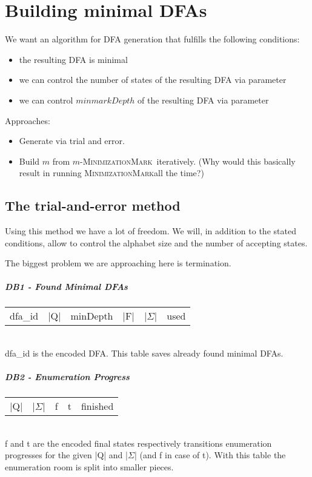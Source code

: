 \documentclass[a4paper, oneside, 11pt]{report}
\theoremstyle{definition}
\theoremstyle{remark}
\newcommand{\MinMark}{\textsc{MinimizationMark}}
\begin{document}
\chapter{Building minimal DFAs}

We want an algorithm for DFA generation that fulfills the following conditions:
\begin{itemize}
	\item the resulting DFA is minimal
	\item we can control the number of states of the resulting DFA via parameter
	\item we can control $minmarkDepth$ of the resulting DFA via parameter
\end{itemize}
Approaches:
\begin{itemize}
	\item Generate via trial and error.
	\item Build $m$ from $m$-\MinMark\ iteratively. (Why would this basically result in running \MinMark all the time?)
\end{itemize}

\section{The trial-and-error method}

Using this method we have a lot of freedom. We will, in addition to the stated conditions, allow to control the alphabet size and the number of accepting states.

The biggest problem we are approaching here is termination.

\paragraph*{DB1 - Found Minimal DFAs}

\begin{tabular}{c c c c c c}
	dfa\_id & |Q| & minDepth & |F| & |$\Sigma$| & used
\end{tabular}\\
dfa\_id is the encoded DFA. This table saves already found minimal DFAs.

\paragraph*{DB2 - Enumeration Progress}

\begin{tabular}{c c c c c}
	|Q| & |$\Sigma$| & f & t & finished
\end{tabular}\\
f and t are the encoded final states respectively transitions enumeration progresses for the given |Q| and |$\Sigma$| (and f in case of t). With this table the enumeration room is split into smaller pieces.
\end{document}

